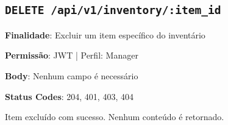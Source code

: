 \subsection{\texttt{DELETE /api/v1/inventory/:item\_id}}

\noindent\textbf{Finalidade}: Excluir um item específico do inventário

\noindent\textbf{Permissão}: JWT | Perfil: Manager

\noindent\textbf{Body}: Nenhum campo é necessário

\noindent\textbf{Status Codes}: 204, 401, 403, 404

\begin{tcolorbox}[colback=green!5, colframe=black, title=\textbf{204 No Content}]
Item excluído com sucesso. Nenhum conteúdo é retornado.
\end{tcolorbox}
